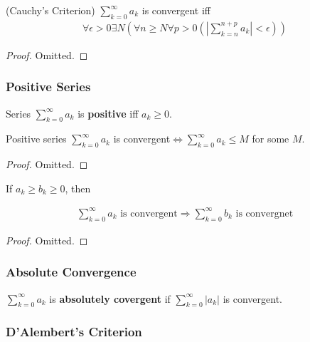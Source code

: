 \documentclass[Total.tex]{subfiles}
\begin{document}
				\begin{proposition}
					(Cauchy's Criterion) $\sum_{k=0}^\infty a_k$ is convergent iff 
					\begin{gather*}
						\forall \epsilon>0\exists N(\forall n\geq N\forall p>0(|\sum_{k=n}^{n+p} a_k|<\epsilon))
					\end{gather*}
				\end{proposition}
				\begin{proof}
					Omitted.
				\end{proof}
				
				\subsubsection{Positive Series}
				
				\begin{Def}
					Series $\sum_{k=0}^\infty a_k$ is \textbf{positive} iff $a_k\geq 0$.
				\end{Def}
				
				\begin{proposition}
					Positive series $\sum_{k=0}^\infty a_k$ is convergent$\Leftrightarrow \sum_{k=0}^\infty a_k\leq M$ for some $M$. 
				\end{proposition}
				\begin{proof}
					Omitted.
				\end{proof}
				
				\begin{proposition}
					If $a_k\geq b_k\geq 0$, then 
					
					\begin{gather*}
						\sum_{k=0}^\infty a_k\mbox{ is convergent}\Rightarrow \sum_{k=0}^\infty b_k\mbox{ is convergnet}
					\end{gather*}
				\end{proposition}
				\begin{proof}
					Omitted.
				\end{proof}
				
				\subsubsection{Absolute Convergence}
				
				\begin{Def}
					$\sum_{k=0}^\infty a_k$ is \textbf{absolutely covergent} if $\sum_{k=0}^\infty |a_k|$ is convergent.
				\end{Def}
			
				\subsubsection{D'Alembert's Criterion}
					
\end{document}
